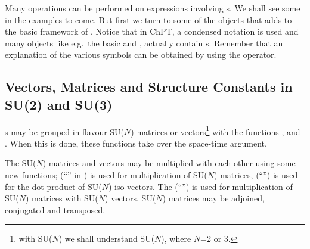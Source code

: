Many operations can be performed on expressions involving s. We shall see some in the examples to come. But first we turn to some of the objects that \fphi adds to the basic framework of \fc. Notice that in ChPT, a condensed notation is used and many objects like e.g.~the basic  and , actually contain s. Remember that an explanation of the various symbols can be obtained by using the  operator.

\subsection{Vectors, Matrices and Structure Constants in SU(2) and SU(3)}

s may be grouped in flavour SU($N$) matrices or vectors\footnote{with SU($N$) we shall understand  SU($N$), where $N$=2 or 3.} with the functions ,  and . When this is done, these functions take over the space-time argument.



The SU($N$) matrices and vectors may be multiplied with each other using some new functions;  (``\mb{$\SixPointedStar$}'' in ) is used for multiplication of SU($N$) matrices,  (``\mb{$\cdot$}'') is used for the dot product of SU($N$) iso-vectors. The \mma {} (``'') is used for multiplication of SU($N$) matrices with SU($N$) vectors. SU($N$) matrices may be adjoined, conjugated and transposed.

\beom
{}
\enom

